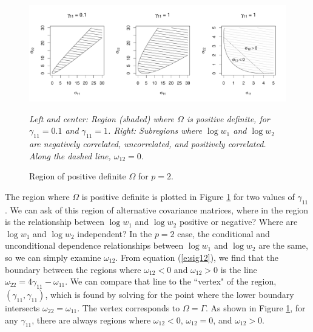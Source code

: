 \documentclass[10pt]{article}
\newcommand{\var}{\operatorname{var}}
\begin{document}

\begin{figure}
\caption{Region of positive definite $\Omega$ for $p=2$.}
\label{f:regions}
\begin{center}
\includegraphics[width=6.5in]{figs/regions-2.pdf}
\begin{small}
\textit{Left and center: Region (shaded) where $\Omega$ is positive definite, for $\gamma_{11} = 0.1$ and $\gamma_{11} = 1$. Right: Subregions where $\log w_1$ and $\log w_2$ are negatively correlated, uncorrelated, and positively correlated. Along the dashed line, $\omega_{12} = 0$.}
\end{small}
\end{center}
\end{figure}

The region where $\Omega$ is positive definite is plotted in Figure \ref{f:regions} for two values of $\gamma_{11}$. We can ask of this region of alternative covariance matrices, where in the region is the relationship between $\log w_1$ and $\log w_2$ positive or negative? Where are $\log w_1$ and $\log w_2$ independent? In the $p = 2$ case, the conditional and unconditional dependence relationships between $\log w_1$ and $\log w_2$ are the same, so we can simply examine $\omega_{12}$. From equation (\ref{e:sig12}), we find that the boundary between the regions where $\omega_{12} < 0$ and $\omega_{12} > 0$ is the line $\omega_{22} = 4\gamma_{11} - \omega_{11}$. We can compare that line to the ``vertex" of the region, $(\gamma_{11}, \gamma_{11})$, which is found by solving for the point where the lower boundary intersects $\omega_{22} = \omega_{11}$. The vertex corresponds to $\Omega = \Gamma$. As shown in Figure \ref{f:regions}, for any $\gamma_{11}$, there are always regions where $\omega_{12} < 0$, $\omega_{12} = 0$, and $\omega_{12} > 0$.
\end{document}
